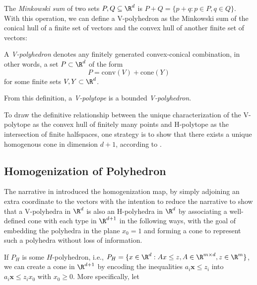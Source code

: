 \documentclass{TC}
\begin{document}
The \emph{Minkowski sum} of two sets $P, Q \subseteq \R^d$ is $P+Q = \{ p+q: p \in P, q\in Q\}$. With this operation, we can define a V-polyhedron as the Minkowski sum of the conical hull of a finite set of vectors and the convex hull of another finite set of vectors:

\begin{definition}[V-polyhedron] A \emph{V-polyhedron} denotes any finitely generated convex-conical combination, in other words, a set $P \subset \R^d$ of the form
$$P = \mathrm{conv}(V) + \mathrm{cone}(Y) $$
for some finite sets $V, Y \subset \R^d$.
\end{definition}

From this definition, a \emph{V-polytope} is a bounded \emph{V-polyhedron}. 

To draw the definitive relationship between the unique characterization of the V-polytope as the convex hull of finitely many points and H-polytope as the intersection of finite halfspaces, one strategy is to show that there exists a unique homogenous cone in dimension $d+1$, according to \cite{Ziegler}.

\subsection{Homogenization of Polyhedron} \label{homogenization_map}
The narrative in \cite{Ziegler} introduced the homogenization map, by simply adjoining an extra coordinate to the vectors with the intention to reduce the narrative to show that a V-polyhedra in $\R^d$ is also an H-polyhedra in $\R^d$ by associating a well-defined cone with each type in $\R^{d+1}$ in the following ways, with the goal of embedding the polyhedra in the plane $x_0 = 1$ and forming a cone to represent such a polyhedra without loss of information.

If $P_H$ is some $H$-polyhedron, i.e., $P_H = \{ x \in \R^d : Ax \leq z, A \in \R^{m\times d}, z \in \R^m\}$, we can create a cone in $\R^{d+1}$ by encoding the inequalities $a_i \mathbf x \leq z_i$ into $a_i\mathbf x \leq z_i x_0$ with $x_0 \geq 0$. More specifically, let  
\end{document}
